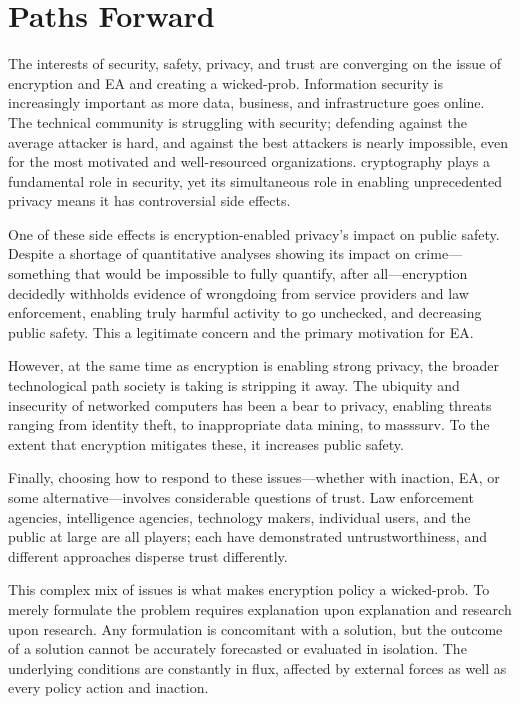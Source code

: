\chapter{Paths Forward}
\label{chap-pathsforward}

The interests of security, safety, privacy, and trust are converging on the issue of encryption and \acl{EA} and
creating a \ac{wicked-prob}. Information security is increasingly important as more data, business, and infrastructure
goes online. The technical community is struggling with security; defending against the average attacker is hard, and
against the best attackers is nearly impossible, even for the most motivated and well-resourced organizations.
\Ac{cryptography} plays a fundamental role in security, yet its simultaneous role in enabling unprecedented privacy
means it has controversial side effects.

One of these side effects is encryption-enabled privacy's impact on public safety. Despite a shortage of quantitative
analyses showing its impact on crime---something that would be impossible to fully quantify, after all---encryption
decidedly withholds evidence of wrongdoing from service providers and law enforcement, enabling truly harmful activity
to go unchecked, and decreasing public safety. This a legitimate concern and the primary motivation for \ac{EA}.

However, at the same time as encryption is enabling strong privacy, the broader technological path society is taking is
stripping it away. The ubiquity and insecurity of networked computers has been a bear to privacy, enabling threats
ranging from identity theft, to inappropriate data mining, to \ac{masssurv}. To the extent that encryption mitigates
these, it increases public safety.

Finally, choosing how to respond to these issues---whether with inaction, \ac{EA}, or some alternative---involves
considerable questions of trust. Law enforcement agencies, intelligence agencies, technology makers, individual users,
and the public at large are all players; each have demonstrated untrustworthiness, and different approaches disperse
trust differently.


This complex mix of issues is what makes encryption policy a \ac{wicked-prob}. To merely formulate the problem requires
explanation upon explanation and research upon research. Any formulation is concomitant with a solution, but the outcome
of a solution cannot be accurately forecasted or evaluated in isolation. The underlying conditions are constantly in
flux, affected by external forces as well as every policy action and inaction.

